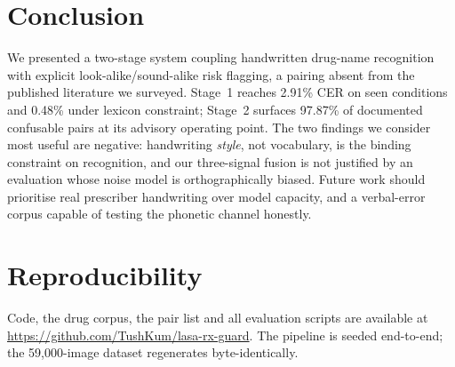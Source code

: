 \documentclass[conference]{IEEEtran}
\begin{document}
\section{Conclusion}
We presented a two-stage system coupling handwritten drug-name recognition with
explicit look-alike/sound-alike risk flagging, a pairing absent from the
published literature we surveyed. Stage~1 reaches 2.91\% CER on seen conditions
and 0.48\% under lexicon constraint; Stage~2 surfaces 97.87\% of documented
confusable pairs at its advisory operating point. The two findings we consider
most useful are negative: handwriting \emph{style}, not vocabulary, is the
binding constraint on recognition, and our three-signal fusion is not justified
by an evaluation whose noise model is orthographically biased. Future work
should prioritise real prescriber handwriting over model capacity, and a
verbal-error corpus capable of testing the phonetic channel honestly.

\section*{Reproducibility}
Code, the drug corpus, the pair list and all evaluation scripts are available at
\url{https://github.com/TushKum/lasa-rx-guard}. The pipeline is seeded
end-to-end; the 59{,}000-image dataset regenerates byte-identically.



\end{document}
